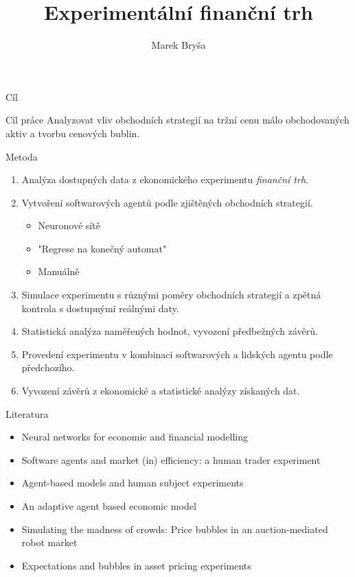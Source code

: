 \documentclass[xcolor=dvipsnames]{beamer}
\title{Experimentální finanční trh}
\author{Marek Bryša}
\institute
{
Masarykova Univerzita\\
Přírodovědecká fakulta
}
\begin{document}
  \frame{\titlepage}
\begin{frame}{Cíl}
	\begin{center}
	\begin{minipage}{10cm}
	\begin{block}{Cíl práce}
	Analyzovat vliv obchodních strategií na tržní cenu málo obchodovaných aktiv a tvorbu cenových bublin.
	\end{block}	
	\end{minipage}
	\end{center}

\end{frame}
\begin{frame}{Metoda}
	\begin{enumerate}
		\item 
			Analýza dostupných data z ekonomického experimentu \emph{finanční trh}.
		\item
			Vytvoření softwarových agentů podle zjištěných obchodních strategií.
			\begin{itemize}
				\item Neuronové sítě
				\item "Regrese na konečný automat"
				\item Manuálně
			\end{itemize}
		 \item
		 	Simulace experimentu s různými poměry obchodních strategií a zpětná kontrola s dostupnými reálnými daty.
		 \item Statistická analýza naměřených hodnot, vyvození předbežných závěrů.
		 \item Provedení experimentu v kombinaci softwarových a lidských agentu podle předchozího.
		 \item Vyvození závěrů z ekonomické a statistické analýzy získaných dat.
	\end{enumerate}
\end{frame}
\begin{frame}{Literatura}
	\begin{itemize}
	
\item Neural networks for economic and financial modelling
\item Software agents and market (in) efficiency: a human trader experiment 
\item Agent-based models and human subject experiments
\item An adaptive agent based economic model
\item Simulating the madness of crowds: Price bubbles in an auction-mediated robot market
\item Expectations and bubbles in asset pricing experiments
	\end{itemize}
\end{frame}
\end{document}
